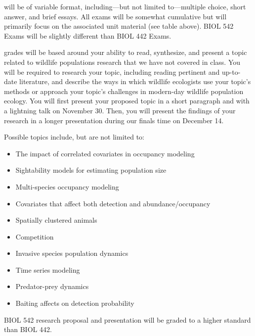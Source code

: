 \documentclass{tufte-handout}
\begin{document}
 will be of variable format, including---but not limited to---multiple choice, short answer, and brief essays. All exams will be somewhat cumulative but will primarily focus on the associated unit material (see table above). BIOL 542 Exams will be slightly different than BIOL 442 Exams. 

\begin{fullwidth}

 grades will be based around your ability to read, synthesize, and present a topic related to wildlife populations research that we have not covered in class. You will be required to research your topic, including reading pertinent and up-to-date literature, and describe the ways in which wildlife ecologists use your topic's methods or approach your topic's challenges in modern-day wildlife population ecology. You will first present your proposed topic in a short paragraph and with a lightning talk on November 30. Then, you will present the findings of your research in a longer presentation during our finals time on December 14. 

Possible topics include, but are not limited to: 


\begin{itemize}
\item The impact of correlated covariates in occupancy modeling
\item Sightability models for estimating population size
\item Multi-species occupancy modeling
\item Covariates that affect both detection and abundance/occupancy
\item Spatially clustered animals
\item Competition 
\item Invasive species population dynamics
\item Time series modeling
\item Predator-prey dynamics
\item Baiting affects on detection probability
\end{itemize}

BIOL 542 research proposal and presentation will be graded to a higher standard than BIOL 442. 






\end{fullwidth}
\end{document}

